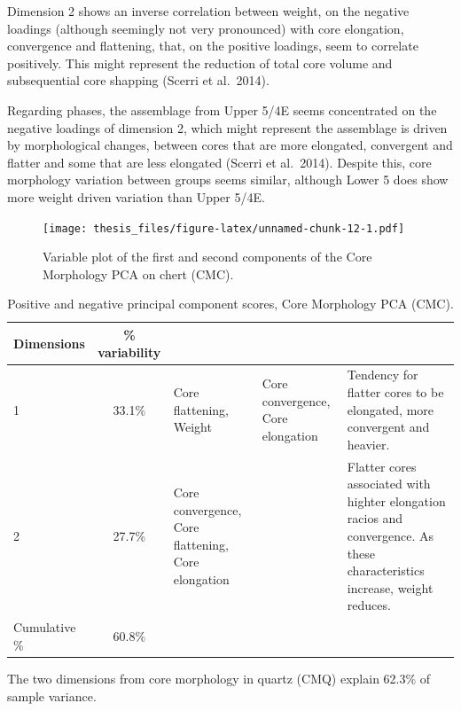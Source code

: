 \documentclass[12pt,twoside]{reedthesis}
\begin{document}
Dimension 2 shows an inverse correlation between weight, on the negative loadings (although seemingly not very pronounced) with core elongation, convergence and flattening, that, on the positive loadings, seem to correlate positively. This might represent the reduction of total core volume and subsequential core shapping (Scerri et al.~2014).

Regarding phases, the assemblage from Upper 5/4E seems concentrated on the negative loadings of dimension 2, which might represent the assemblage is driven by morphological changes, between cores that are more elongated, convergent and flatter and some that are less elongated (Scerri et al.~2014). Despite this, core morphology variation between groups seems similar, although Lower 5 does show more weight driven variation than Upper 5/4E.
\begin{figure}
\centering
\texttt{[image: thesis\_files/figure-latex/unnamed-chunk-12-1.pdf]}
\caption{\label{fig:unnamed-chunk-12}Variable plot of the first and second components of the Core Morphology PCA on chert (CMC).}
\end{figure}
\begin{table}[!h]

\caption{\label{tab:unnamed-chunk-13}Positive and negative principal component scores, Core Morphology PCA (CMC).}
\centering
\begin{tabular}[t]{lc>{\raggedright\arraybackslash}p{3cm}>{\raggedright\arraybackslash}p{3cm}>{\raggedright\arraybackslash}p{3cm}}
\toprule
\multicolumn{1}{c}{\textbf{Dimensions}} & \multicolumn{1}{c}{\textbf{\% variability}} & \multicolumn{1}{>{\centering\arraybackslash}p{3cm}}{\textbf{+}} & \multicolumn{1}{>{\centering\arraybackslash}p{3cm}}{\textbf{-}} & \multicolumn{1}{>{\centering\arraybackslash}p{3cm}}{\textbf{Interpretation}}\\
\midrule
1 & 33.1\% & Core flattening, Weight & Core convergence, Core elongation & Tendency for flatter cores to be elongated, more convergent and heavier.\\
2 & 27.7\% & Core convergence, Core flattening, Core elongation &  & Flatter cores associated with highter elongation racios and convergence. As these characteristics increase, weight reduces.\\
Cumulative \% & 60.8\% &  &  & \\
\bottomrule
\end{tabular}
\end{table}
The two dimensions from core morphology in quartz (CMQ) explain 62.3\% of sample variance.
\end{document}
